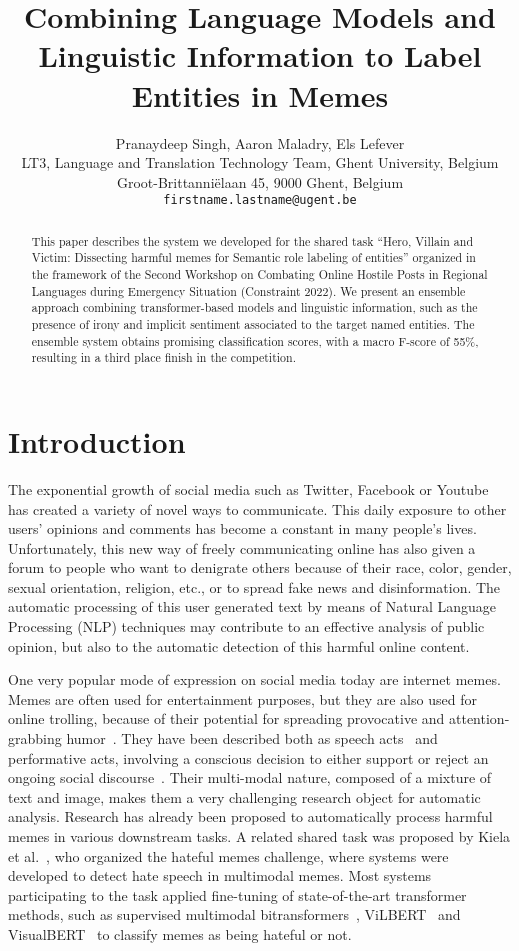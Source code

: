 \documentclass[11pt]{article}
\title{Combining Language Models and Linguistic Information to Label Entities in Memes}
\author{Pranaydeep Singh, Aaron Maladry, Els Lefever\\
LT3, Language and Translation Technology Team, Ghent University, Belgium\\
Groot-Brittanni\"{e}laan 45, 9000 Ghent, Belgium\\
 \texttt{firstname.lastname@ugent.be} \\}
\begin{document}
\maketitle

\begin{abstract}
This paper describes the system we developed for the shared task ``Hero, Villain and Victim: Dissecting harmful memes for Semantic role labeling of entities'' organized in the framework of the Second Workshop on Combating Online Hostile Posts in Regional Languages during Emergency Situation (Constraint 2022). 
We present an ensemble approach combining transformer-based models and linguistic information, such as the presence of irony and implicit sentiment associated to the target named entities. The ensemble system obtains promising classification scores, with a macro F-score of 55\%, resulting in a third place finish in the competition. 
\end{abstract}

\section{Introduction}

The exponential growth of social media such as Twitter, Facebook or Youtube has created a variety of novel ways to communicate. This daily exposure to other users’ opinions and comments has become a constant in many people’s lives. Unfortunately, this new way of freely communicating online has also given a forum to people who want to denigrate others because of their race, color, gender, sexual orientation, religion, etc., or to spread fake news and disinformation.
The automatic processing of this user generated text by means of Natural Language Processing (NLP) techniques may contribute to an effective analysis of public opinion, but also to the automatic detection of this harmful online content. 

One very popular mode of expression on social media today are internet memes. Memes are often used for entertainment purposes, but they are also used for online trolling, because of their potential for spreading provocative and
attention-grabbing humor~\cite{Leaver2013}. They have been described both as speech acts~\cite{Grundlingh2018} and performative acts, involving a conscious decision to either support or reject an ongoing social discourse~\cite{Gal2016}. Their multi-modal nature, composed of a mixture of text and image, makes them a very challenging research object for automatic analysis.
Research has already been proposed to automatically process harmful memes in various downstream tasks. A related shared task was proposed by Kiela et al.~, who organized the hateful memes challenge, where systems were developed to detect hate speech in multimodal memes. Most systems participating to the task applied fine-tuning of state-of-the-art transformer methods, such as supervised multimodal bitransformers~\cite{Kiela2019}, ViLBERT~\cite{Lu2019} and VisualBERT~\cite{Li2019} to classify memes as being hateful or not. 
\end{document}
